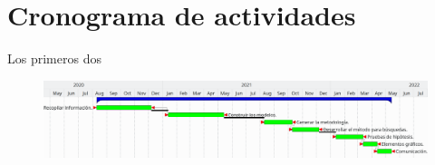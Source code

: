 \section {Cronograma de actividades}
Los primeros dos 
\begin{figure}[H]\centering\includegraphics[width=1\linewidth]{gantt.png}\end{figure}